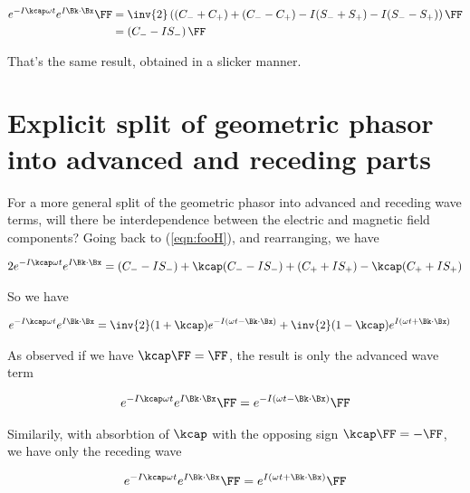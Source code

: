 \begin{align*}
e^{ -I \kcap \omega t } e^{ I \Bk \cdot \Bx } \FF
&=
\inv{2}
\left( 
(C_{-} + C_{+})
+(C_{-} - C_{+})
-I (S_{-} + S_{+})
-I (S_{-} - S_{+})
\right) \FF \\
&=
\left( C_{-} -I S_{-} \right) \FF
\end{align*}

That's the same result, obtained in a slicker manner.

\section{Explicit split of geometric phasor into advanced and receding parts}

For a more general split of the geometric phasor into advanced and receding wave terms, will there be interdependence between the electric and magnetic field components?   Going back to (\ref{eqn:fooH}), and rearranging, we have

\begin{align*}
2 e^{ -I \kcap \omega t } e^{ I \Bk \cdot \Bx }
&=
(C_{-} -I S_{-})
+\kcap (C_{-} -I S_{-} )
+(C_{+} +I S_{+})
-\kcap (C_{+} +I S_{+}) \\
\end{align*}

So we have

\begin{align}\label{eqn:fooJ}
e^{ -I \kcap \omega t } e^{ I \Bk \cdot \Bx }
&=
\inv{2}(1 + \kcap)e^{-I(\omega t - \Bk \cdot \Bx)}
+\inv{2}(1 - \kcap)e^{I(\omega t + \Bk \cdot \Bx)}
\end{align}

As observed if we have $\kcap \FF = \FF$, the result is only the advanced wave term

\begin{align*}
e^{ -I \kcap \omega t } e^{ I \Bk \cdot \Bx } \FF = e^{-I(\omega t - \Bk \cdot \Bx)} \FF
\end{align*}

Similarily, with absorbtion of $\kcap$ with the opposing sign $\kcap \FF = -\FF$, we have only the receding wave

\begin{align*}
e^{ -I \kcap \omega t } e^{ I \Bk \cdot \Bx } \FF = e^{I(\omega t + \Bk \cdot \Bx)} \FF
\end{align*}


\EndArticle
